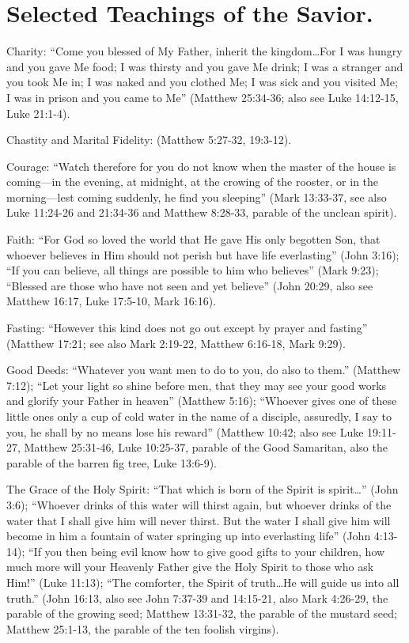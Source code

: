 \section{Selected Teachings of the Savior.}

Charity: ``Come you blessed of My Father, inherit the kingdom\ldots For I was hungry and you gave Me food; I was thirsty and you gave Me drink; I was a stranger and you took Me in; I was naked and you clothed Me; I was sick and you visited Me; I was in prison and you came to Me'' (Matthew 25:34-36; also see Luke 14:12-15, Luke 21:1-4).

Chastity and Marital Fidelity: (Matthew 5:27-32, 19:3-12).

Courage: ``Watch therefore for you do not know when the master of the house is coming---in the evening, at midnight, at the crowing of the rooster, or in the morning---lest coming suddenly, he find you sleeping'' (Mark 13:33-37, see also Luke 11:24-26 and 21:34-36 and Matthew 8:28-33, parable of the unclean spirit).

Faith: ``For God so loved the world that He gave His only begotten Son, that whoever believes in Him should not perish but have life everlasting'' (John 3:16); ``If you can believe, all things are possible to him who believes'' (Mark 9:23); ``Blessed are those who have not seen and yet believe'' (John 20:29, also see Matthew 16:17, Luke 17:5-10, Mark 16:16).

Fasting: ``However this kind does not go out except by prayer and fasting'' (Matthew 17:21; see also Mark 2:19-22, Matthew 6:16-18, Mark 9:29).

Good Deeds: ``Whatever you want men to do to you, do also to them.'' (Matthew 7:12); ``Let your light so shine before men, that they may see your good works and glorify your Father in heaven'' (Matthew 5:16); ``Whoever gives one of these little ones only a cup of cold water in the name of a disciple, assuredly, I say to you, he shall by no means lose his reward'' (Matthew 10:42; also see Luke 19:11-27, Matthew 25:31-46, Luke 10:25-37, parable of the Good Samaritan, also the parable of the barren fig tree, Luke 13:6-9).

The Grace of the Holy Spirit: ``That which is born of the Spirit is spirit\ldots'' (John 3:6); ``Whoever drinks of this water will thirst again, but whoever drinks of the water that I shall give him will never thirst. But the water I shall give him will become in him a fountain of water springing up into everlasting life'' (John 4:13-14); ``If you then being evil know how to give good gifts to your children, how much more will your Heavenly Father give the Holy Spirit to those who ask Him!'' (Luke 11:13); ``The comforter, the Spirit of truth\ldots He will guide us into all truth.'' (John 16:13, also see John 7:37-39 and 14:15-21, also Mark 4:26-29, the parable of the growing seed; Matthew 13:31-32, the parable of the mustard seed; Matthew 25:1-13, the parable of the ten foolish virgins).

